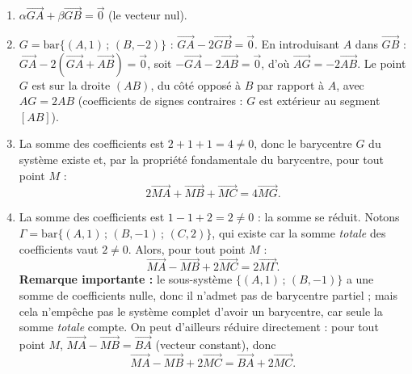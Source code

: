 \documentclass[11pt]{article}
\begin{document}
\begin{corrige}
\begin{enumerate}
\item $\alpha\overrightarrow{GA}+\beta\overrightarrow{GB}=\vec{0}$ (le vecteur nul).
\item $G=\mathrm{bar}\{(A,1)\,;\,(B,-2)\}$ : $\overrightarrow{GA}-2\overrightarrow{GB}=\vec{0}$. En introduisant $A$ dans $\overrightarrow{GB}$ : $\overrightarrow{GA}-2(\overrightarrow{GA}+\overrightarrow{AB})=\vec{0}$, soit $-\overrightarrow{GA}-2\overrightarrow{AB}=\vec{0}$, d'où $\overrightarrow{AG}=-2\overrightarrow{AB}$. Le point $G$ est sur la droite $(AB)$, du côté opposé à $B$ par rapport à $A$, avec $AG=2AB$ (coefficients de signes contraires : $G$ est extérieur au segment $[AB]$).
\item La somme des coefficients est $2+1+1=4\neq 0$, donc le barycentre $G$ du système existe et, par la propriété fondamentale du barycentre, pour tout point $M$ :
\[ 2\overrightarrow{MA}+\overrightarrow{MB}+\overrightarrow{MC}=4\overrightarrow{MG}. \]
\item La somme des coefficients est $1-1+2=2\neq 0$ : la somme se réduit. Notons $\Gamma=\mathrm{bar}\{(A,1)\,;\,(B,-1)\,;\,(C,2)\}$, qui existe car la somme \emph{totale} des coefficients vaut $2\neq 0$. Alors, pour tout point $M$ :
\[ \overrightarrow{MA}-\overrightarrow{MB}+2\overrightarrow{MC}=2\overrightarrow{M\Gamma}. \]
\textbf{Remarque importante :} le sous-système $\{(A,1)\,;\,(B,-1)\}$ a une somme de coefficients nulle, donc il n'admet pas de barycentre partiel ; mais cela n'empêche pas le système complet d'avoir un barycentre, car seule la somme \emph{totale} compte. On peut d'ailleurs réduire directement : pour tout point $M$, $\overrightarrow{MA}-\overrightarrow{MB}=\overrightarrow{BA}$ (vecteur constant), donc
\[ \overrightarrow{MA}-\overrightarrow{MB}+2\overrightarrow{MC}=\overrightarrow{BA}+2\overrightarrow{MC}. \]
\end{enumerate}
\end{corrige}
\end{document}
